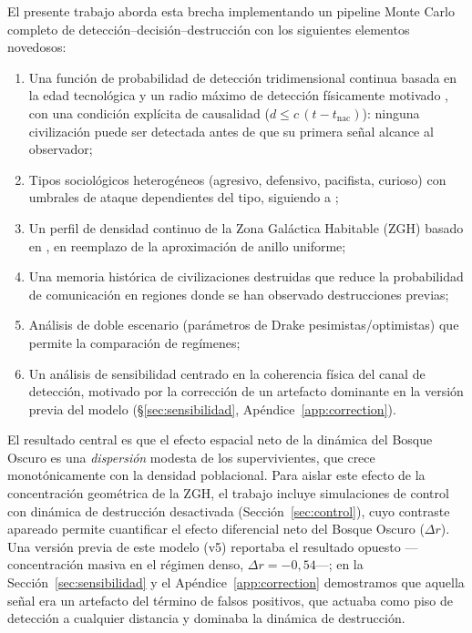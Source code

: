 \documentclass[useAMS,usenatbib,onecolumn]{mn2e}
\begin{document}
El presente trabajo aborda esta brecha implementando un pipeline
Monte Carlo completo de detección--decisión--destrucción con los
siguientes elementos novedosos:
\begin{enumerate}
  \item Una función de probabilidad de detección tridimensional
        continua basada en la edad tecnológica y un radio máximo de
        detección físicamente motivado
        \citep[$r_\text{max} = 1000$\,al,][]{troitskij1989,loeb2007},
        con una condición explícita de causalidad
        ($d \leq c\,(t - t_\text{nac})$): ninguna civilización puede
        ser detectada antes de que su primera señal alcance al
        observador;
  \item Tipos sociológicos heterogéneos (agresivo, defensivo, pacifista,
        curioso) con umbrales de ataque dependientes del tipo, siguiendo
        a \citet{devladar2013};
  \item Un perfil de densidad continuo de la Zona Galáctica Habitable
        (ZGH) basado en \citet{lineweaver2004}, en reemplazo de la
        aproximación de anillo uniforme;
  \item Una memoria histórica de civilizaciones destruidas que reduce la
        probabilidad de comunicación en regiones donde se han observado
        destrucciones previas;
  \item Análisis de doble escenario (parámetros de Drake
        pesimistas/optimistas) que permite la comparación de regímenes;
  \item Un análisis de sensibilidad centrado en la coherencia física
        del canal de detección, motivado por la corrección de un
        artefacto dominante en la versión previa del modelo
        (\S\ref{sec:sensibilidad}, Apéndice~\ref{app:correction}).
\end{enumerate}

El resultado central es que el efecto espacial neto de la dinámica del
Bosque Oscuro es una \emph{dispersión} modesta de los supervivientes,
que crece monotónicamente con la densidad poblacional.
Para aislar este efecto de la concentración geométrica de la ZGH, el
trabajo incluye simulaciones de control con dinámica de destrucción
desactivada (Sección~\ref{sec:control}), cuyo contraste apareado
permite cuantificar el efecto diferencial neto del Bosque Oscuro
($\Delta r$).
Una versión previa de este modelo (v5) reportaba el resultado opuesto
—concentración masiva en el régimen denso, $\Delta r = -0{,}54$—;
en la Sección~\ref{sec:sensibilidad} y el
Apéndice~\ref{app:correction} demostramos que aquella señal era un
artefacto del término de falsos positivos, que actuaba como piso de
detección a cualquier distancia y dominaba la dinámica de destrucción.
\end{document}
